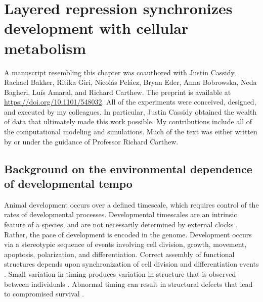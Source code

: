 \graphicspath{ {figures/metabolism/} }


\chapter{Layered repression synchronizes development with cellular metabolism}
\label{ch:metabolism}

A manuscript resembling this chapter was coauthored with Justin Cassidy, Rachael Bakker, Ritika Giri, Nicol\'{a}s Pel\'{a}ez, Bryan Eder, Anna Bobrowska, Neda Bagheri, Lu\'{i}s Amaral, and Richard Carthew. The preprint is available at \url{https://doi.org/10.1101/548032}. All of the experiments were conceived, designed, and executed by my colleagues. In particular, Justin Cassidy obtained the wealth of data that ultimately made this work possible. My contributions include all of the computational modeling and simulations. Much of the text was either written by or under the guidance of Professor Richard Carthew.


\section{Background on the environmental dependence of developmental tempo}

Animal development occurs over a defined timescale, which requires control of the rates of developmental processes. Developmental timescales are an intrinsic feature of a species, and are not necessarily determined by external clocks \cite{Ebisuya2018}. Rather, the pace of development is encoded in the genome. Development occurs via a stereotypic sequence of events involving cell division, growth, movement, apoptosis, polarization, and differentiation. Correct assembly of functional structures depends upon synchronization of cell division and differentiation events \cite{Foe1989,Sulston1983}. Small variation in timing produces variation in structure that is observed between individuals \cite{Francesconi2014,Poullet2016}. Abnormal timing can result in structural defects that lead to compromised survival \cite{Moss2007}.

